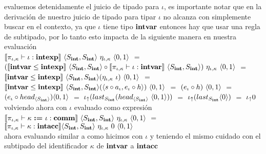 evaluemos detenidamente el juicio de tipado para $\iota$, es importante notar que en
la derivaci\'on de nuestro juicio de tipado  para tipar $\iota$ no alcanza con
simplemente buscar en el contexto, ya que $\iota$ tiene tipo $\textbf{intvar}$ entonces
hay que usar una regla de subtipado, por lo tanto esto impacta de la siguiente
manera en nuestra evaluaci\'on\\

$\llbracket  \pi_{\iota,\kappa} \vdash \iota : \textbf{intexp}  \rrbracket 
	\ \langle S_{\textbf{int}},S_{\textbf{int}} \rangle
	\ \eta_{\iota,\kappa} 
	\ \langle 0,1 \rangle$ $=$ \\
	\indent
	$(\semBrcks{\intvar \leq \intexp} \ \lrangles{S_\intt,S_\intt}
	\circ 
	\semBrcks{ \pi_{\iota,\kappa} \vdash \iota : \intvar } \ \lrangles{S_\intt,S_\intt})
		\ \eta_{\iota,\kappa} 
		\ \lrangles{0,1}$ $=$\\
	\indent
	$\semBrcks{\intvar \leq \intexp} \ \lrangles{S_\intt,S_\intt} 
				(\eta_{\iota,\kappa} \ \iota) \ \lrangles{0,1}$ $=$\\
	\indent
	$\semBrcks{\intvar \leq \intexp} \ \lrangles{S_\intt,S_\intt} 
				(\lrangles{s \circ a_\iota,e_\iota \circ h}) \ \lrangles{0,1}$ $=$
	$(e_\iota \circ h) \ \langle 0,1 \rangle$ $=$\\
	\indent
	$(e_\iota \circ head_{\langle S_{\textbf{int}} \rangle}) \langle 0,1 \rangle$ $=$
	$\iota_{\uparrow} (last_{S_{\textbf{int}}} (head_{\langle S_{\textbf{int}} \rangle} \ \langle 0,1 \rangle))$ $=$
	$\iota_{\uparrow} (last_{S_{\textbf{int}}} \langle 0 \rangle)$ $=$ $\iota_{\uparrow} 0$\\
	
volviendo ahora con $\iota$ evaluado como expresi\'on\\

$\llbracket \pi_{\iota,\kappa} \vdash \kappa \ \textbf{:=} \ \iota: \textbf{comm} \rrbracket
		\ \langle S_{\textbf{int}},S_{\textbf{int}} \rangle \ \eta_{\iota,\kappa}
		\ \langle 0,1 \rangle$ $=$\\
\indent \indent \indent \indent
$\llbracket \pi_{\iota,\kappa} \vdash \kappa : \textbf{intacc} \rrbracket
	\langle S_{\textbf{int}},S_{\textbf{int}} \rangle 
	\ \eta_{\iota,\kappa}
	\ 0 \ \langle 0,1 \rangle$\\

ahora evaluando similar a como hicimos con $\iota$ y teniendo el mismo cuidado
con el subtipado del identificador $\kappa$ de $\textbf{intvar}$ a $\textbf{intacc}$\\

